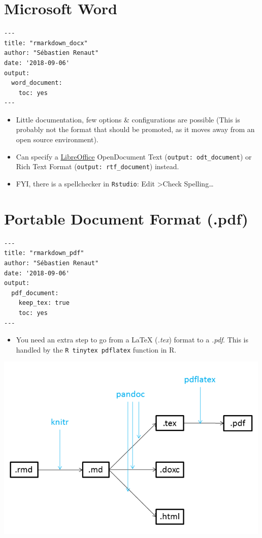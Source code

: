 \documentclass[]{article}
\providecommand{\tightlist}{%
  \setlength{\itemsep}{0pt}\setlength{\parskip}{0pt}}
\begin{document}
\hypertarget{microsoft-word}{%
\section{Microsoft Word}\label{microsoft-word}}

\begin{verbatim}
---  
title: "rmarkdown_docx"  
author: "Sébastien Renaut"  
date: '2018-09-06'  
output: 
  word_document: 
    toc: yes
---   
\end{verbatim}

\begin{itemize}
\item
  Little documentation, few options \& configurations are possible (This
  is probably not the format that should be promoted, as it moves away
  from an open source environment).
\item
  Can specify a \href{https://www.libreoffice.org/}{LibreOffice}
  OpenDocument Text (\texttt{output:\ odt\_document}) or Rich Text
  Format (\texttt{output:\ rtf\_document}) instead.
\item
  FYI, there is a spellchecker in \texttt{Rstudio}: Edit
  \textgreater{}Check Spelling\ldots{}
\end{itemize}

\hypertarget{portable-document-format-.pdf}{%
\section{Portable Document Format
(.pdf)}\label{portable-document-format-.pdf}}

\begin{verbatim}
---    
title: "rmarkdown_pdf"    
author: "Sébastien Renaut"    
date: '2018-09-06'    
output: 
  pdf_document:
    keep_tex: true
    toc: yes  
---    
\end{verbatim}

\begin{itemize}
\tightlist
\item
  You need an extra step to go from a LaTeX (\emph{.tex}) format to a
  \emph{.pdf}. This is handled by the \texttt{R\ tinytex\ pdflatex}
  function in R.
\end{itemize}

\includegraphics[width=5.20833in,height=\textheight]{../figures/pandoc1.png}
\end{document}
